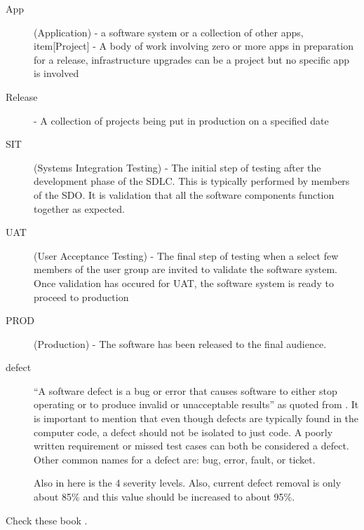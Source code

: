 \documentclass[SDSUThesis.tex]{subfiles}
\begin{document}
\begin{description}

    \item[App] (Application) - a software system or a collection of other apps, item[Project] - A body of work involving zero or more apps in preparation for a release, infrastructure upgrades can be a project but no specific app is involved
    \item[Release] - A collection of projects being put in production on a specified date
    \item[SIT]   (Systems Integration Testing) - The initial step of testing
        after the development phase of the SDLC.  This is typically 
        performed by members of the SDO.  It is validation that all the
        software components function together as expected.
    \item[UAT]   (User Acceptance Testing) - The final step of testing
        when a select few members of the user group are invited to
        validate the software system. Once validation has occured for
        UAT, the software system is ready to proceed to production
    \item[PROD]  (Production) - The software has been released to the final audience.
    \item[defect] ``A software defect is a bug or error that causes
                software to either stop operating or to produce
                invalid or unacceptable results'' as quoted from
            \cite{Jones2009}.  It is important to mention that even though defects are typically 
            found in the computer code, a defect should not be isolated to just code.   A poorly written requirement or missed test cases can 
            both be considered a defect.  Other common names for a defect are: bug, error, fault, or ticket.
            
              Also in here is the 4 severity levels.  Also, current defect removal is only about 85\% and this value should be increased to about 95\%. 
\end{description}

Check these book \cite{Jones2009, Jones1996, Lee2003}. 
\end{document}
